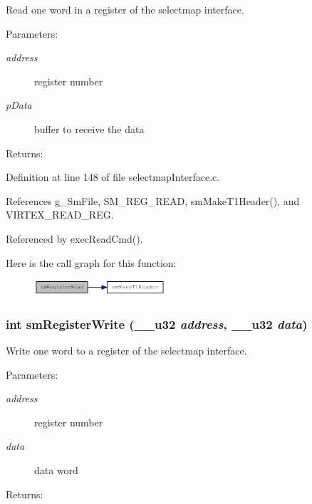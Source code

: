 Read one word in a register of the selectmap interface. 

\begin{Desc}
\item[Parameters:]
\begin{description}
\item[{\em address}]register number \item[{\em p\-Data}]buffer to receive the data \end{description}
\end{Desc}
\begin{Desc}
\item[Returns:]\end{Desc}


Definition at line 148 of file selectmap\-Interface.c.

References g\_\-Sm\-File, SM\_\-REG\_\-READ, sm\-Make\-T1Header(), and VIRTEX\_\-READ\_\-REG.

Referenced by exec\-Read\-Cmd().

Here is the call graph for this function:\begin{figure}[H]
\begin{center}
\leavevmode
\includegraphics[width=138pt]{group__selectmap__access_gf7536588344d4c30f928de00a240baa8_cgraph}
\end{center}
\end{figure}
\hypertarget{group__selectmap__access_ge0d7561e2ddca5878fe0c39c948dfdd2}{
\subsubsection[smRegisterWrite]{\setlength{\rightskip}{0pt plus 5cm}int sm\-Register\-Write (\_\-\_\-u32 {\em address}, \_\-\_\-u32 {\em data})}}
\label{group__selectmap__access_ge0d7561e2ddca5878fe0c39c948dfdd2}


Write one word to a register of the selectmap interface. 

\begin{Desc}
\item[Parameters:]
\begin{description}
\item[{\em address}]register number \item[{\em data}]data word \end{description}
\end{Desc}
\begin{Desc}
\item[Returns:]\end{Desc}


